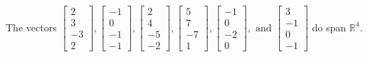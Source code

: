 \begin{exercise}
\begin{exerciseStatement}
  \end{exerciseStatement}
  \begin{exerciseAnswer}
   The vectors \(\left[\begin{array}{r}
2 \\
3 \\
-3 \\
2
\end{array}\right] , \left[\begin{array}{r}
-1 \\
0 \\
-1 \\
-1
\end{array}\right] , \left[\begin{array}{r}
2 \\
4 \\
-5 \\
-2
\end{array}\right] , \left[\begin{array}{r}
5 \\
7 \\
-7 \\
1
\end{array}\right] , \left[\begin{array}{r}
-1 \\
0 \\
-2 \\
0
\end{array}\right] , \text{ and } \left[\begin{array}{r}
3 \\
-1 \\
0 \\
-1
\end{array}\right]\) 
  	 do  
	span \(\mathbb{R}^4\).
  


  \end{exerciseAnswer}
\end{exercise}